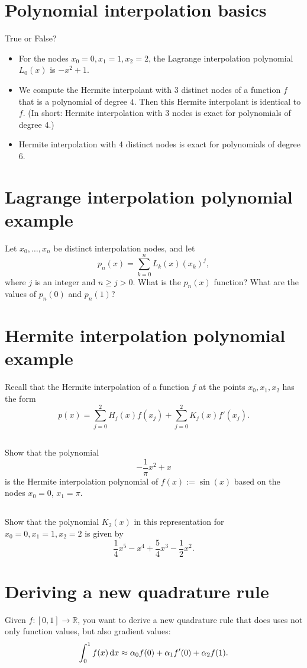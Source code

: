 \documentclass[11pt,letterpaper]{article}
\begin{document}
\section{Polynomial interpolation basics}
True or False?
\begin{itemize}
\item For the nodes $x_0=0, x_1=1, x_2= 2$, the
  Lagrange interpolation polynomial $L_0(x)$ is $-x^2 + 1$.
\item We compute the Hermite interpolant with 3 distinct nodes of
  a function $f$ that is a polynomial of degree $4$. Then this
  Hermite interpolant is identical to $f$. (In short: Hermite
  interpolation with 3 nodes is exact for polynomials of degree 4.)
\item Hermite interpolation with 4 distinct nodes is exact for
  polynomials of degree 6.
\end{itemize}

\section{Lagrange interpolation polynomial example}
Let $x_0,\ldots, x_n$ be distinct interpolation nodes, and let
  $$
  p_n(x) = \sum^n_{k=0}L_{k}(x)(x_k)^j,
  $$
where $j$ is an integer and $n \geq j>0$. What is the $p_n(x)$ function? What are the values of $p_n(0)$ and $p_n(1)$?

\section{Hermite interpolation polynomial example}
Recall that the Hermite interpolation of a function $f$ at the points $x_0,x_1,x_2$ has the form 
$$p(x) = \sum_{j=0}^2H_j(x)f(x_j)
+ \sum_{j=0}^2K_j(x)f'(x_j).$$ 
  
\subsection{}
Show that the polynomial
$$ -\frac{1}{\pi}x^2 + x$$ 
is the Hermite interpolation polynomial of $f(x):=\sin(x)$ based on the nodes $x_0=0$, $x_1=\pi$.
  
\subsection{}
Show that the polynomial $K_2(x)$ in
this representation for $x_0=0,x_1=1,x_2=2$ is given by
$$
\frac{1}{4}x^5 - x^4 + \frac{5}{4}x^3 - \frac{1}{2}x^2.
$$

\newpage
\section{Deriving a new quadrature rule}
Given $f:[0,1]\rightarrow \mathbb{R}$, you want to derive a new
  quadrature rule that does uses not only function values, but also
  gradient values:
\begin{align}
    \int_0^1 f(x)\,\mathrm{d} x \approx \alpha_0 f(0) + \alpha_1 f'(0) + \alpha_2 f(1). \label{eq:11_3a}
\end{align}
  
\end{document}
